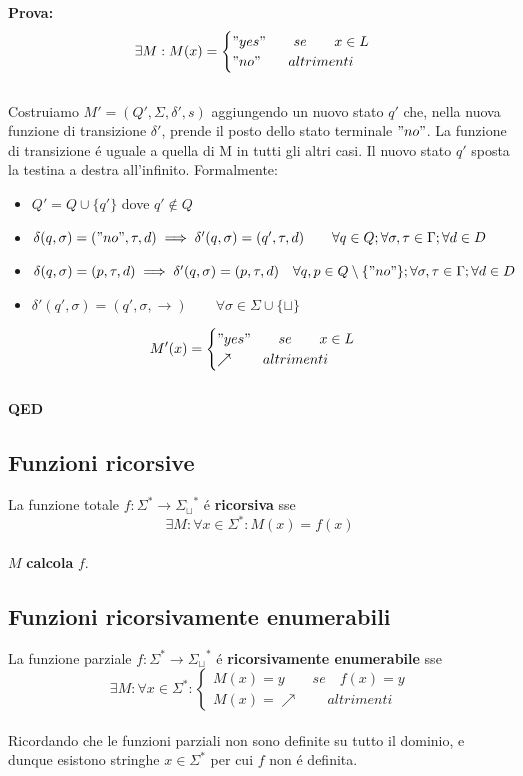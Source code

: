\textbf{Prova:} \\
\[\exists M :  M(x) =
\begin{cases}
	"yes" \qquad se \qquad x \in L \\
	"no" \qquad altrimenti
\end{cases}
\] \\
Costruiamo $M' = (Q', \Sigma, \delta', s)$ aggiungendo un nuovo stato $q'$ che, nella nuova funzione di transizione $\delta'$, prende il posto dello stato terminale $"no"$. La funzione di transizione é uguale a quella di M in tutti gli altri casi. Il nuovo stato $q'$ sposta la testina a destra all'infinito. Formalmente:
\begin{itemize}
	\item $Q' = Q \cup \{q'\}$ \quad dove \quad $q' \notin Q$
	\item $\delta(q, \sigma) = ("no",  \tau, d) \implies \delta'(q, \sigma) = (q', \tau, d)  \qquad \forall q \in Q;  \forall \sigma, \tau \in \Gamma;  \forall d \in D$
	\item $\delta(q, \sigma) = (p,  \tau, d) \implies \delta'(q, \sigma) = (p, \tau, d)  \quad \forall q, p \in Q \setminus \{"no"\};  \forall \sigma, \tau \in \Gamma;  \forall d \in D$
	\item $\delta'(q', \sigma) = (q', \sigma, \rightarrow) \qquad \forall \sigma \in \Sigma \cup \{\sqcup\}$
\end{itemize}
\[M'(x) =
\begin{cases}
	"yes" \qquad se \qquad x \in L \\
	\nearrow \qquad altrimenti
\end{cases}
\] \\
\textbf{QED}

\subsection{Funzioni ricorsive}
La funzione totale $f : \Sigma^* \rightarrow {\Sigma_\sqcup}^*$ é \textbf{ricorsiva} sse \[\exists M :  \forall x \in \Sigma^* : M(x) = f(x) \] \\
$M$ \textbf{calcola} $f$. \\

\subsection{Funzioni ricorsivamente enumerabili}
La funzione parziale $f : \Sigma^* \rightarrow {\Sigma_\sqcup}^*$ é \textbf{ricorsivamente enumerabile} sse \[\exists M :  \forall x \in \Sigma^* : \begin{cases}
	M(x) = y \qquad se \quad f(x) = y \\
	M(x) = \nearrow \qquad altrimenti
\end{cases}
\] \\
Ricordando che le funzioni parziali non sono definite su tutto il dominio, e dunque esistono stringhe $x \in \Sigma^*$ per cui $f$ non é definita.


